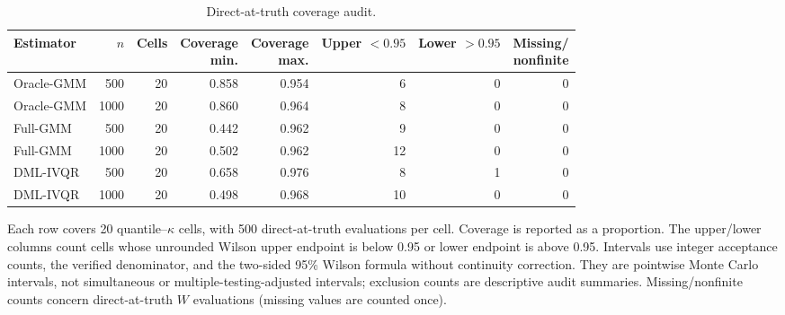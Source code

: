 \begin{table}[!ht]
\caption{Direct-at-truth coverage audit.}
\label{tab:coverage-audit-summary}
\centering
\begin{tabular}{lrrrrrrr}
\toprule
Estimator & $n$ & Cells & \shortstack{Coverage\\min.} & \shortstack{Coverage\\max.} & \shortstack{Upper\\$<0.95$} & \shortstack{Lower\\$>0.95$} & \shortstack{Missing/\\nonfinite} \\
\midrule
Oracle-GMM & 500 & 20 & 0.858 & 0.954 & 6 & 0 & 0 \\
Oracle-GMM & 1000 & 20 & 0.860 & 0.964 & 8 & 0 & 0 \\
Full-GMM & 500 & 20 & 0.442 & 0.962 & 9 & 0 & 0 \\
Full-GMM & 1000 & 20 & 0.502 & 0.962 & 12 & 0 & 0 \\
DML-IVQR & 500 & 20 & 0.658 & 0.976 & 8 & 1 & 0 \\
DML-IVQR & 1000 & 20 & 0.498 & 0.968 & 10 & 0 & 0 \\
\bottomrule
\end{tabular}
\begin{tablenotes}
Each row covers 20 quantile--$\kappa$ cells, with 500 direct-at-truth evaluations per cell. Coverage is reported as a proportion. The upper/lower columns count cells whose unrounded Wilson upper endpoint is below 0.95 or lower endpoint is above 0.95. Intervals use integer acceptance counts, the verified denominator, and the two-sided 95\% Wilson formula without continuity correction. They are pointwise Monte Carlo intervals, not simultaneous or multiple-testing-adjusted intervals; exclusion counts are descriptive audit summaries. Missing/nonfinite counts concern direct-at-truth $W$ evaluations (missing values are counted once).
\end{tablenotes}
\end{table}
